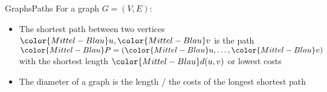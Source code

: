 \begin{frame}{Graphs}{Paths}
  For a graph {\color{Mittel-Blau}$G = (V, E)$}:
  \begin{itemize}
    \item
      The {\color{Mittel-Blau}shortest path} between two vertices
      ${\color{Mittel-Blau}u}, {\color{Mittel-Blau}v}$ is the path
      \begin{math}
      {\color{Mittel-Blau}P}
      = ({\color{Mittel-Blau}u}, \dots, {\color{Mittel-Blau}v})
      \end{math}
      with the shortest length ${\color{Mittel-Blau}d(u,v)}$ or lowest costs
    \item
      The {\color{Mittel-Blau}diameter} of a graph is the length / the costs of
      the {\color{Mittel-Blau}longest shortest path}
  \end{itemize}
\end{frame}